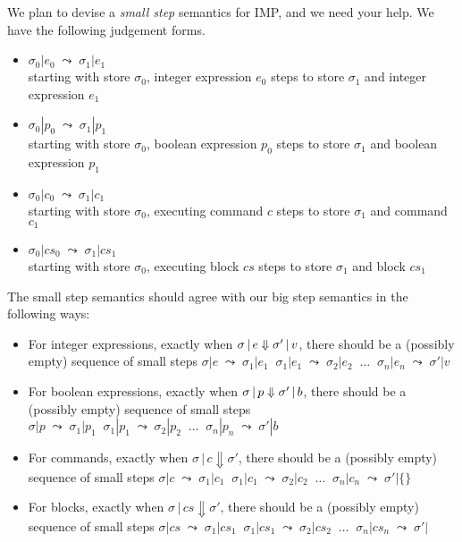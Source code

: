 \documentclass{article}
\begin{document}
\newcommand{\execJ}[3]{#1 \,|\, #2 \Downarrow #3}
\newcommand{\cs}{\mathit{cs}}
\newcommand{\cmp}{\mathit{cmp}}
\newcommand{\fbx}[1]{\framebox{\ensuremath{#1}}}



\newcommand{\ssj}[4]{#1|#2 \;\leadsto\; #3|#4}

 We plan to devise a \emph{small step} semantics for IMP, and we need
your help. We have the following judgement forms.

\begin{itemize}
\item $\ssj{\sigma_0}{e_0}{\sigma_1}{e_1}$\\
  starting with store $\sigma_0$, integer expression $e_0$ steps to store $\sigma_1$ and integer expression $e_1$
\item $\ssj{\sigma_0}{p_0}{\sigma_1}{p_1}$\\
  starting with store $\sigma_0$, boolean expression $p_0$ steps to
  store $\sigma_1$ and boolean expression $p_1$
\item $\ssj{\sigma_0}{c_0}{\sigma_1}{c_1}$\\
  starting with store $\sigma_0$, executing command $c$ steps to store
  $\sigma_1$ and command $c_1$
\item $\ssj{\sigma_0}{\cs_0}{\sigma_1}{\cs_1}$\\
  starting with store $\sigma_0$, executing block $\cs$ steps to store
  $\sigma_1$ and block $\cs_1$
\end{itemize}

The small step semantics should agree with our big step semantics in
the following ways:

\begin{itemize}
  \item For integer expressions, exactly when $\sigma \,|\, e \Downarrow \sigma' \,|\, v$, there should
    be a (possibly empty) sequence of small steps
    $\ssj{\sigma}{e}{\sigma_1}{e_1} \;\;
    \ssj{\sigma_1}{e_1}{\sigma_2}{e_2}\;\;\ldots\;\;
    \ssj{\sigma_n}{e_n}{\sigma'}{v}$
  \item For boolean expressions, exactly when $\sigma \,|\, p \Downarrow \sigma' \,|\, b$, there should
    be a (possibly empty) sequence of small steps
    $\ssj{\sigma}{p}{\sigma_1}{p_1} \;\;
    \ssj{\sigma_1}{p_1}{\sigma_2}{p_2}\;\;\ldots\;\;
    \ssj{\sigma_n}{p_n}{\sigma'}{b}$
  \item For commands, exactly when $\execJ{\sigma}{c}{\sigma'}$, there should
    be a (possibly empty) sequence of small steps
    $\ssj{\sigma}{c}{\sigma_1}{c_1} \;\;
    \ssj{\sigma_1}{c_1}{\sigma_2}{c_2}\;\;\ldots\;\;
    \ssj{\sigma_n}{c_n}{\sigma'}{\{\}}$
  \item For blocks, exactly when $\execJ{\sigma}{\cs}{\sigma'}$, there should
    be a (possibly empty) sequence of small steps
    $\ssj{\sigma}{\cs}{\sigma_1}{\cs_1} \;\;
    \ssj{\sigma_1}{\cs_1}{\sigma_2}{\cs_2}\;\;\ldots\;\;
    \ssj{\sigma_n}{\cs_n}{\sigma'}{}$
\end{itemize}
\end{document}
